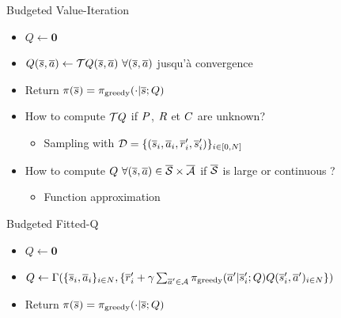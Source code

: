 \documentclass{beamer}
\begin{document}
    \begin{frame}

        \begin{block}{Budgeted Value-Iteration}
            \begin{itemize}
                \item $Q \leftarrow \mathbf{0}$
                \item $Q(\os,\oa) \leftarrow \bo Q(\os,\oa)\ \forall (\os,\oa)$ jusqu'à convergence %
                \item Return $\pi(\overline{s}) = \pi_\text{greedy}(\cdot|\overline{s}; Q)$
            \end{itemize}
        \end{block}
        \pause
        \begin{alertblock}{}
            \begin{itemize}
                \item How to compute $\mathcal{T} Q$ if $P$, $R$ et $C$ are unknown?
                \begin{itemize}
                    \item Sampling with $\mathcal{D}=\{(\overline{s}_i,\overline{a}_i,\overline{r}_i',\overline{s}_i')\}_{i\in[0,N]}$
                \end{itemize}
                \item How to compute $Q\ \forall (\overline{s},\overline{a}) \in \overline{\mathcal{S}}\times\overline{\mathcal{A}}$ if $\overline{\mathcal{S}}$ is large or continuous ?
                \begin{itemize}
                    \item Function approximation
                \end{itemize}
            \end{itemize}

        \end{alertblock}
        \pause
        \begin{block}{Budgeted Fitted-Q}
            \begin{itemize}
                \item $Q \leftarrow \mathbf{0}$
                \item $Q \leftarrow \Gamma(\{\overline{s}_{i},\overline{a}_{i}\}_{{i}\in N},\{\overline{r}'_{i} + \gamma \sum_{\overline{a}'\in \mathcal{A}} \pi_\text{greedy}(\overline{a}'|\overline{s}'_{i}; Q) Q(\overline{s}'_{i}, \overline{a}')_{{i} \in N}\})$
                \item Return $\pi(\overline{s}) = \pi_\text{greedy}(\cdot|\overline{s}; Q)$
            \end{itemize}
        \end{block}
    \end{frame}
\end{document}
